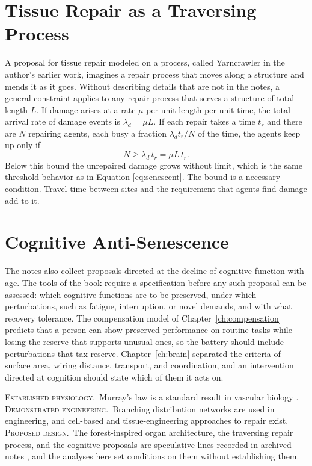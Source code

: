 \documentclass[11pt,openany]{book}
\theoremstyle{definition}
\theoremstyle{remark}
\newcommand{\est}{\textsc{Established physiology.}\ }
\newcommand{\dem}{\textsc{Demonstrated engineering.}\ }
\newcommand{\pro}{\textsc{Proposed design.}\ }
\begin{document}
\section{Tissue Repair as a Traversing Process}

A proposal for tissue repair modeled on a process, called Yarncrawler in the author's earlier work, imagines a repair process that moves along a structure and mends it as it goes. Without describing details that are not in the notes, a general constraint applies to any repair process that serves a structure of total length $L$. If damage arises at a rate $\mu$ per unit length per unit time, the total arrival rate of damage events is $\lambda_d=\mu L$. If each repair takes a time $t_r$ and there are $N$ repairing agents, each busy a fraction $\lambda_dt_r/N$ of the time, the agents keep up only if
\begin{equation}
N\ge\lambda_d\,t_r=\mu L\,t_r.
\label{eq:agents}
\end{equation}
Below this bound the unrepaired damage grows without limit, which is the same threshold behavior as in Equation \eqref{eq:senescent}. The bound is a necessary condition. Travel time between sites and the requirement that agents find damage add to it.

\section{Cognitive Anti-Senescence}

The notes also collect proposals directed at the decline of cognitive function with age. The tools of the book require a specification before any such proposal can be assessed: which cognitive functions are to be preserved, under which perturbations, such as fatigue, interruption, or novel demands, and with what recovery tolerance. The compensation model of Chapter~\ref{ch:compensation} predicts that a person can show preserved performance on routine tasks while losing the reserve that supports unusual ones, so the battery should include perturbations that tax reserve. Chapter~\ref{ch:brain} separated the criteria of surface area, wiring distance, transport, and coordination, and an intervention directed at cognition should state which of them it acts on.

\begin{evidence}
\est Murray's law is a standard result in vascular biology \cite{murray1926}. \dem Branching distribution networks are used in engineering, and cell-based and tissue-engineering approaches to repair exist. \pro The forest-inspired organ architecture, the traversing repair process, and the cognitive proposals are speculative lines recorded in archived notes \cite{flyxion2026les,flyxion2026xylo}, and the analyses here set conditions on them without establishing them.
\end{evidence}
\end{document}
